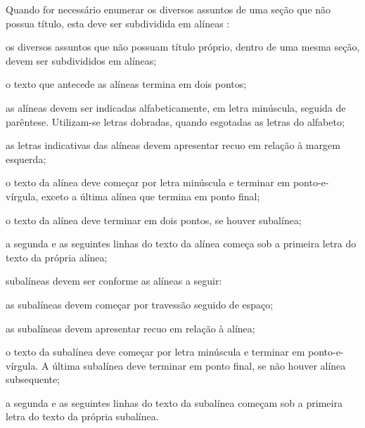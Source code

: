 Quando for necessário enumerar
os diversos assuntos de uma seção que não possua título, esta deve ser
subdividida em alíneas \cite[4.2]{NBR6024:2012}:
\begin{alineas}
  \item os diversos assuntos que não possuam título próprio, dentro de uma mesma
  seção, devem ser subdivididos em alíneas; 
  
  \item o texto que antecede as alíneas termina em dois pontos;
  \item as alíneas devem ser indicadas alfabeticamente, em letra minúscula,
  seguida de parêntese. Utilizam-se letras dobradas, quando esgotadas as
  letras do alfabeto;

  \item as letras indicativas das alíneas devem apresentar recuo em relação à
  margem esquerda;

  \item o texto da alínea deve começar por letra minúscula e terminar em
  ponto-e-vírgula, exceto a última alínea que termina em ponto final;

  \item o texto da alínea deve terminar em dois pontos, se houver subalínea;

  \item a segunda e as seguintes linhas do texto da alínea começa sob a
  primeira letra do texto da própria alínea;
  
  \item subalíneas \cite[4.3]{NBR6024:2012} devem ser conforme as alíneas a
  seguir:

  \begin{alineas}
     \item as subalíneas devem começar por travessão seguido de espaço;

     \item as subalíneas devem apresentar recuo em relação à alínea;

     \item o texto da subalínea deve começar por letra minúscula e terminar em
     ponto-e-vírgula. A última subalínea deve terminar em ponto final, se não
     houver alínea subsequente;

     \item a segunda e as seguintes linhas do texto da subalínea começam sob a
     primeira letra do texto da própria subalínea.
  \end{alineas}
  

\end{alineas}
